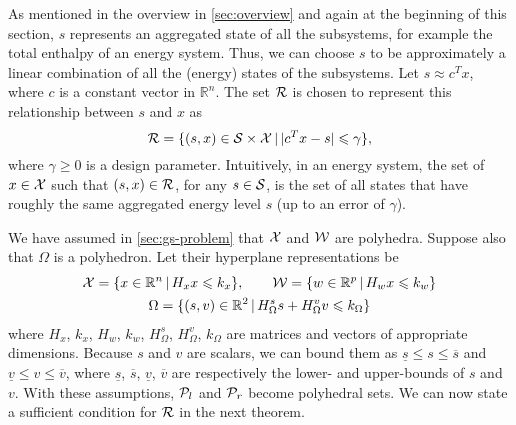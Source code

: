 As mentioned in the overview in \cref{sec:overview} and again at the beginning of this section, $s$ represents an aggregated state of all the subsystems, for example the total enthalpy of an energy system.
Thus, we can choose $s$ to be approximately a linear combination of all the (energy) states of the subsystems.
Let $s \approx c^{T} x$, where $c$ is a constant vector in $\mathbb{R}^{n}$.
The set $\mathcal{R}$ is chosen to represent this relationship between $s$ and $x$ as 
\begin{equation}
  \label{eq:abstraction-gs:R}
  \mathcal{R} = \{ (s,x) \in \mathcal{S} \times \mathcal{X} \,|\, | c^{T} x - s | \leqslant \gamma \} \text,
\end{equation}
where $\gamma \geqslant 0$ is a design parameter.
Intuitively, in an energy system, the set of $x \in \mathcal{X}$ such that $(s,x) \in \mathcal{R}$, for any $s \in \mathcal{S}$, is the set of all states that have roughly the same aggregated energy level $s$ (up to an error of $\gamma$).

We have assumed in \cref{sec:gs-problem} that $\mathcal{X}$ and $\mathcal{W}$ are polyhedra.
Suppose also that $\Omega$ is a polyhedron.
Let their hyperplane representations be
\begin{gather*}
  \mathcal{X} = \{ x \in \mathbb{R}^{n} \,|\, H_{x} x \leqslant k_{x} \}, \qquad
  \mathcal{W} = \{ w \in \mathbb{R}^{p} \,|\, H_{w} x \leqslant k_{w} \}\\
  \Omega = \{ (s,v) \in \mathbb{R}^{2} \,|\, H_{\Omega}^{s} s + H_{\Omega}^{v} v \leqslant k_{\Omega} \}
\end{gather*}
where $H_{x}$, $k_{x}$, $H_{w}$, $k_{w}$, $H_{\Omega}^{s}$, $H_{\Omega}^{v}$, $k_{\Omega}$ are matrices and vectors of appropriate dimensions.
Because $s$ and $v$ are scalars, we can bound them as $\underline{s} \leqslant s \leqslant \overbar{s}$ and $\underline{v} \leqslant v \leqslant \overbar{v}$, where $\underline{s}$, $\overbar{s}$, $\underline{v}$, $\overbar{v}$ are respectively the lower- and upper-bounds of $s$ and $v$.
With these assumptions, $\mathcal{P}_{l}$ and $\mathcal{P}_{r}$ become polyhedral sets.
We can now state a sufficient condition for $\mathcal{R}$ in the next theorem.

